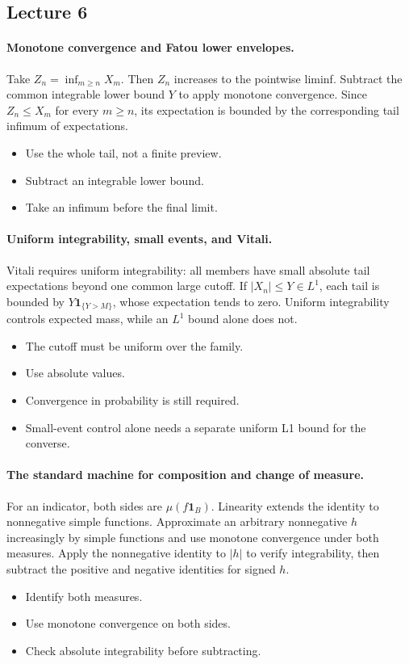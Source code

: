 \documentclass[11pt,letterpaper]{article}
\begin{document}
\subsection{Lecture 6}
\hypertarget{answer-l6-s2}{}\paragraph{Monotone convergence and Fatou lower envelopes.}
Take $Z_n=\inf_{m\ge n}X_m$. Then $Z_n$ increases to the pointwise liminf. Subtract the common integrable lower bound $Y$ to apply monotone convergence. Since $Z_n\le X_m$ for every $m\ge n$, its expectation is bounded by the corresponding tail infimum of expectations.
\begin{itemize}
\item Use the whole tail, not a finite preview.
\item Subtract an integrable lower bound.
\item Take an infimum before the final limit.
\end{itemize}
\hypertarget{answer-l6-s4}{}\paragraph{Uniform integrability, small events, and Vitali.}
Vitali requires uniform integrability: all members have small absolute tail expectations beyond one common large cutoff. If $|X_n|\le Y\in L^1$, each tail is bounded by $Y\mathbf1_{\{Y>M\}}$, whose expectation tends to zero. Uniform integrability controls expected mass, while an $L^1$ bound alone does not.
\begin{itemize}
\item The cutoff must be uniform over the family.
\item Use absolute values.
\item Convergence in probability is still required.
\item Small-event control alone needs a separate uniform L1 bound for the converse.
\end{itemize}
\hypertarget{answer-l6-s7}{}\paragraph{The standard machine for composition and change of measure.}
For an indicator, both sides are $\mu(f\mathbf1_B)$. Linearity extends the identity to nonnegative simple functions. Approximate an arbitrary nonnegative $h$ increasingly by simple functions and use monotone convergence under both measures. Apply the nonnegative identity to $|h|$ to verify integrability, then subtract the positive and negative identities for signed $h$.
\begin{itemize}
\item Identify both measures.
\item Use monotone convergence on both sides.
\item Check absolute integrability before subtracting.
\end{itemize}
\end{document}
